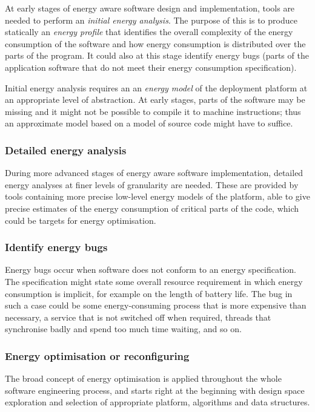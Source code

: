 \documentclass[oneside]{book}
\begin{document}
At early stages of energy aware software design and implementation, tools are needed 
to perform an \emph{initial energy analysis}.  The purpose
of this is to produce statically an \emph{energy profile} that
identifies the overall
complexity of the energy consumption of the software and how energy consumption is
distributed over the parts of the program.   It could also at this stage identify
energy bugs (parts of the application software that do not meet
their energy consumption specification).

Initial energy analysis requires an
an \emph{energy model} of the deployment platform at an appropriate
level of abstraction. At early stages, parts of the software may be missing
and it might not be possible to compile it to machine instructions; thus
an approximate model based on a model of source code might have to
suffice.

\subsubsection{Detailed energy analysis}\label{energy-analysis}

During more advanced stages of energy aware software implementation,
detailed energy analyses at finer levels of granularity are needed.
These are provided by tools containing more precise low-level energy models 
of the platform, able to give precise estimates of the energy consumption
of critical parts of the code, which could be targets for energy optimisation.  


\subsubsection{Identify energy bugs}\label{energy-bugs}
Energy bugs occur when software does not conform to an energy specification.
The specification might state some overall resource requirement in which
energy consumption is implicit, for example on the length of battery life.  The
bug in such a case could be some energy-consuming process that is more
expensive than necessary, a service that is not switched off when required,
threads that synchronise badly and spend too much time waiting, and so on.


\subsubsection{Energy optimisation or reconfiguring}\label{energy-opt}

The broad concept of energy optimisation is applied throughout the whole software
engineering process, and starts
right at the beginning with design space exploration and selection of appropriate platform,
algorithms and data structures.
\end{document}
